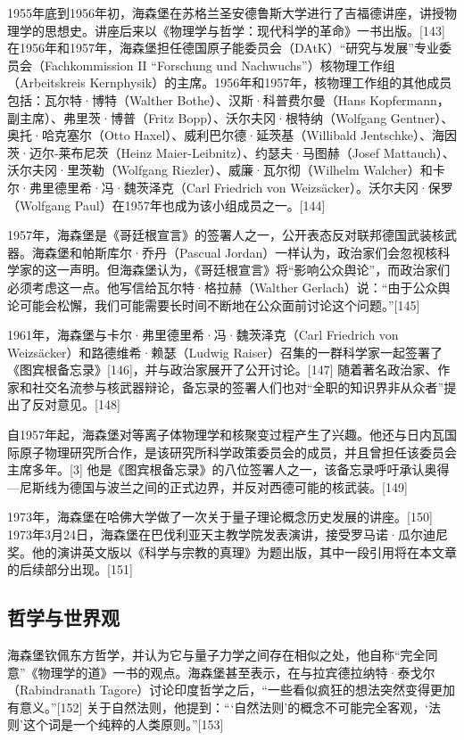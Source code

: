 1955年底到1956年初，海森堡在苏格兰圣安德鲁斯大学进行了吉福德讲座，讲授物理学的思想史。讲座后来以《物理学与哲学：现代科学的革命》一书出版。[143]在1956年和1957年，海森堡担任德国原子能委员会（DAtK）“研究与发展”专业委员会（Fachkommission II “Forschung und Nachwuchs”）核物理工作组（Arbeitskreis Kernphysik）的主席。1956年和1957年，核物理工作组的其他成员包括：瓦尔特·博特（Walther Bothe）、汉斯·科普费尔曼（Hans Kopfermann，副主席）、弗里茨·博普（Fritz Bopp）、沃尔夫冈·根特纳（Wolfgang Gentner）、奥托·哈克塞尔（Otto Haxel）、威利巴尔德·延茨基（Willibald Jentschke）、海因茨·迈尔-莱布尼茨（Heinz Maier-Leibnitz）、约瑟夫·马图赫（Josef Mattauch）、沃尔夫冈·里茨勒（Wolfgang Riezler）、威廉·瓦尔彻（Wilhelm Walcher）和卡尔·弗里德里希·冯·魏茨泽克（Carl Friedrich von Weizsäcker）。沃尔夫冈·保罗（Wolfgang Paul）在1957年也成为该小组成员之一。[144]

1957年，海森堡是《哥廷根宣言》的签署人之一，公开表态反对联邦德国武装核武器。海森堡和帕斯库尔·乔丹（Pascual Jordan）一样认为，政治家们会忽视核科学家的这一声明。但海森堡认为，《哥廷根宣言》将“影响公众舆论”，而政治家们必须考虑这一点。他写信给瓦尔特·格拉赫（Walther Gerlach）说：“由于公众舆论可能会松懈，我们可能需要长时间不断地在公众面前讨论这个问题。”[145]  

1961年，海森堡与卡尔·弗里德里希·冯·魏茨泽克（Carl Friedrich von Weizsäcker）和路德维希·赖瑟（Ludwig Raiser）召集的一群科学家一起签署了《图宾根备忘录》[146]，并与政治家展开了公开讨论。[147] 随着著名政治家、作家和社交名流参与核武器辩论，备忘录的签署人们也对“全职的知识界非从众者”提出了反对意见。[148]  

自1957年起，海森堡对等离子体物理学和核聚变过程产生了兴趣。他还与日内瓦国际原子物理研究所合作，是该研究所科学政策委员会的成员，并且曾担任该委员会主席多年。[3] 他是《图宾根备忘录》的八位签署人之一，该备忘录呼吁承认奥得—尼斯线为德国与波兰之间的正式边界，并反对西德可能的核武装。[149]  

1973年，海森堡在哈佛大学做了一次关于量子理论概念历史发展的讲座。[150] 1973年3月24日，海森堡在巴伐利亚天主教学院发表演讲，接受罗马诺·瓜尔迪尼奖。他的演讲英文版以《科学与宗教的真理》为题出版，其中一段引用将在本文章的后续部分出现。[151]  
\subsection{哲学与世界观}
海森堡钦佩东方哲学，并认为它与量子力学之间存在相似之处，他自称“完全同意”《物理学的道》一书的观点。海森堡甚至表示，在与拉宾德拉纳特·泰戈尔（Rabindranath Tagore）讨论印度哲学之后，“一些看似疯狂的想法突然变得更加有意义。”[152]  关于自然法则，他提到：“‘自然法则’的概念不可能完全客观，‘法则’这个词是一个纯粹的人类原则。”[153]  

